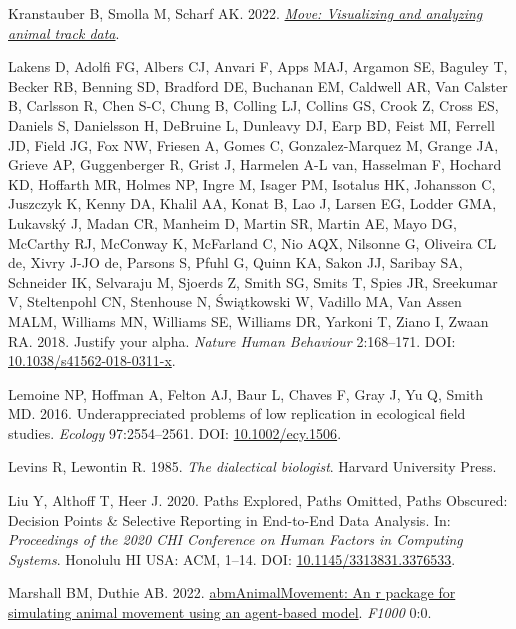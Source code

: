 \documentclass[10pt,a4paper]{article}
\newlength{\cslhangindent}
\newlength{\cslentryspacingunit} %
\newenvironment{CSLReferences}[2] %
 {%
  \setlength{\parindent}{0pt}
  \ifodd #1
  \let\oldpar\par
  \def\par{\hangindent=\cslhangindent\oldpar}
  \fi
  \setlength{\parskip}{#2\cslentryspacingunit}
 }%
 {}
\begin{document}
\begin{CSLReferences}{1}{0}
\leavevmode{}%
Kranstauber B, Smolla M, Scharf AK. 2022. \emph{\href{https://CRAN.R-project.org/package=move}{Move: Visualizing and analyzing animal track data}}.

\leavevmode{}%
Lakens D, Adolfi FG, Albers CJ, Anvari F, Apps MAJ, Argamon SE, Baguley T, Becker RB, Benning SD, Bradford DE, Buchanan EM, Caldwell AR, Van Calster B, Carlsson R, Chen S-C, Chung B, Colling LJ, Collins GS, Crook Z, Cross ES, Daniels S, Danielsson H, DeBruine L, Dunleavy DJ, Earp BD, Feist MI, Ferrell JD, Field JG, Fox NW, Friesen A, Gomes C, Gonzalez-Marquez M, Grange JA, Grieve AP, Guggenberger R, Grist J, Harmelen A-L van, Hasselman F, Hochard KD, Hoffarth MR, Holmes NP, Ingre M, Isager PM, Isotalus HK, Johansson C, Juszczyk K, Kenny DA, Khalil AA, Konat B, Lao J, Larsen EG, Lodder GMA, Lukavský J, Madan CR, Manheim D, Martin SR, Martin AE, Mayo DG, McCarthy RJ, McConway K, McFarland C, Nio AQX, Nilsonne G, Oliveira CL de, Xivry J-JO de, Parsons S, Pfuhl G, Quinn KA, Sakon JJ, Saribay SA, Schneider IK, Selvaraju M, Sjoerds Z, Smith SG, Smits T, Spies JR, Sreekumar V, Steltenpohl CN, Stenhouse N, Świątkowski W, Vadillo MA, Van Assen MALM, Williams MN, Williams SE, Williams DR, Yarkoni T, Ziano I, Zwaan RA. 2018. Justify your alpha. \emph{Nature Human Behaviour} 2:168--171. DOI: \href{https://doi.org/10.1038/s41562-018-0311-x}{10.1038/s41562-018-0311-x}.

\leavevmode{}%
Lemoine NP, Hoffman A, Felton AJ, Baur L, Chaves F, Gray J, Yu Q, Smith MD. 2016. Underappreciated problems of low replication in ecological field studies. \emph{Ecology} 97:2554--2561. DOI: \href{https://doi.org/10.1002/ecy.1506}{10.1002/ecy.1506}.

\leavevmode{}%
Levins R, Lewontin R. 1985. \emph{The dialectical biologist}. Harvard University Press.

\leavevmode{}%
Liu Y, Althoff T, Heer J. 2020. Paths {Explored}, {Paths} {Omitted}, {Paths} {Obscured}: {Decision} {Points} \& {Selective} {Reporting} in {End}-to-{End} {Data} {Analysis}. In: \emph{Proceedings of the 2020 {CHI} {Conference} on {Human} {Factors} in {Computing} {Systems}}. Honolulu HI USA: ACM, 1--14. DOI: \href{https://doi.org/10.1145/3313831.3376533}{10.1145/3313831.3376533}.

\leavevmode{}%
Marshall BM, Duthie AB. 2022. \href{https://0}{abmAnimalMovement: An r package for simulating animal movement using an agent-based model}. \emph{F1000} 0:0.


\end{CSLReferences}
\end{document}
